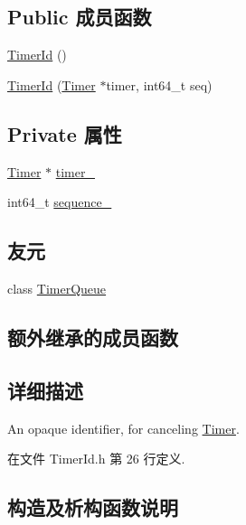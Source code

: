 \subsection*{Public 成员函数}
\begin{DoxyCompactItemize}
\item 
\hyperlink{classmuduo_1_1net_1_1TimerId_a2cd765e7f0f9a8e46859b6f8485d4d30}{Timer\+Id} ()
\item 
\hyperlink{classmuduo_1_1net_1_1TimerId_a356d897a6fda89a895c95d8e28f35e27}{Timer\+Id} (\hyperlink{classmuduo_1_1Timer}{Timer} $\ast$timer, int64\+\_\+t seq)
\end{DoxyCompactItemize}
\subsection*{Private 属性}
\begin{DoxyCompactItemize}
\item 
\hyperlink{classmuduo_1_1Timer}{Timer} $\ast$ \hyperlink{classmuduo_1_1net_1_1TimerId_ae667852d5ad62e431751ceb013368cb9}{timer\+\_\+}
\item 
int64\+\_\+t \hyperlink{classmuduo_1_1net_1_1TimerId_a16b9981eba82482428dd663754b65888}{sequence\+\_\+}
\end{DoxyCompactItemize}
\subsection*{友元}
\begin{DoxyCompactItemize}
\item 
class \hyperlink{classmuduo_1_1net_1_1TimerId_a865df28c10927729363ac18d3d83f35b}{Timer\+Queue}
\end{DoxyCompactItemize}
\subsection*{额外继承的成员函数}


\subsection{详细描述}
An opaque identifier, for canceling \hyperlink{classmuduo_1_1Timer}{Timer}. 

在文件 Timer\+Id.\+h 第 26 行定义.



\subsection{构造及析构函数说明}
\mbox{\label{classmuduo_1_1net_1_1TimerId_a2cd765e7f0f9a8e46859b6f8485d4d30}} 
